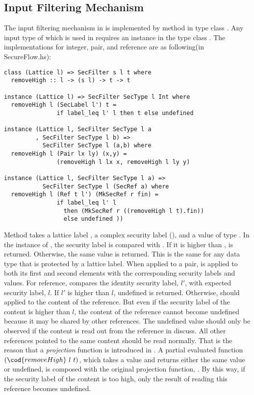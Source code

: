 \subsection{Input Filtering Mechanism}
The input filtering mechanism in  is implemented by 
method  in type class . Any input type of  which is used in 
 requires an instance in the type class . The implementations for integer, pair,
and reference are as following(in SecureFlow.hs):
\begin{verbatim}
class (Lattice l) => SecFilter s l t where
  removeHigh :: l -> (s l) -> t -> t

instance (Lattice l) => SecFilter SecType l Int where
  removeHigh l (SecLabel l') t = 
               if label_leq l' l then t else undefined

instance (Lattice l, SecFilter SecType l a
         , SecFilter SecType l b) =>
           SecFilter SecType l (a,b) where
  removeHigh l (Pair lx ly) (x,y) = 
               (removeHigh l lx x, removeHigh l ly y)

instance (Lattice l, SecFilter SecType l a) =>
           SecFilter SecType l (SecRef a) where
  removeHigh l (Ref t l') (MkSecRef r fin) = 
               if label_leq l' l
                 then (MkSecRef r ((removeHigh l t).fin))
                 else undefined ))
\end{verbatim}
Method  takes a lattice label , a complex security label (), and a value of 
type . In the instance of , the security label is compared with . If it is higher 
than ,  is returned. Otherwise, the same value is returned. This is the same for any 
data type that is protected by a lattice label.
When  applied to a pair,  is applied to both its first and second elements
with the corresponding security labels and values.
For reference,  compares the identity security label, $l'$, with expected security label, $l$. 
If $l'$ is higher than $l$, undefined is returned. Otherwise,  should applied to the content
of the reference. But even if the security label of the content is higher than $l$, the content of the 
reference cannot become undefined because it may be shared by other references. The undefined value should
only be observed if the content is read out from the reference in discuss. All other references pointed to
the same content should be read normally. That is the reason that a {\em projection}
function is introduced in . A partial evaluated function $(\cod{removeHigh}~l~t)$, which takes
a value and returns either the same value or undefined, is composed with the original projection function,
. By this way, if the security label of the content is too high, only the result of reading this
reference becomes undefined.

